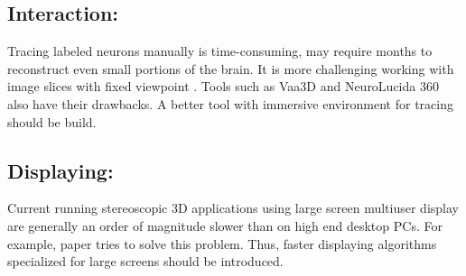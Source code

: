 \documentclass[10pt,twocolumn,letterpaper]{article}
\begin{document}
\subsection{Interaction:}Tracing labeled neurons manually is time-consuming, may require months to reconstruct even small portions of the brain. It is more challenging working with image slices with fixed viewpoint \cite{Usher2018}. Tools such as Vaa3D and NeuroLucida 360 also have their drawbacks. A better tool with immersive environment for tracing should be build.
\subsection{Displaying:}Current running stereoscopic 3D applications using large screen multiuser display are generally an order of magnitude slower than on high end desktop PCs. For example, paper \cite{Wiebrands2018} tries to solve this problem. Thus, faster displaying algorithms specialized for large screens should be introduced. 

{\small


}
\end{document}
